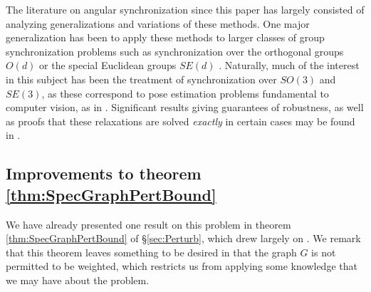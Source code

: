 The literature on angular synchronization since this paper has largely consisted of analyzing generalizations and variations of these methods.  One major generalization has been to apply these methods to larger classes of group synchronization problems such as synchronization over the orthogonal groups $O(d)$ or the special Euclidean groups $SE(d)$ \cite{Cheeger,briales2017cartan_sync,bandeira2016se_sync}.  Naturally, much of the interest in this subject has been the treatment of synchronization over $SO(3)$ and $SE(3)$, as these correspond to pose estimation problems fundamental to computer vision, as in \cite{govindu2006motion_avg, fischler1981ransac, olsson2017rot_avg, enqvist2011nonsequential}.  Significant results giving guarantees of robustness, as well as proofs that these relaxations are solved \emph{exactly} in certain cases may be found in \cite{alexeev2014phase, bandeira2016tightness, olsson2017rot_avg, bandeira2016se_sync}.

\subsection{Improvements to theorem \ref{thm:SpecGraphPertBound}}

We have already presented one result on this problem in theorem \ref{thm:SpecGraphPertBound} of \S\ref{sec:Perturb}, which drew largely on \cite{alexeev2014phase}.  %
We remark that this theorem leaves something to be desired in that the graph $G$ is not permitted to be weighted, which restricts us from applying some knowledge that we may have about the problem.  

